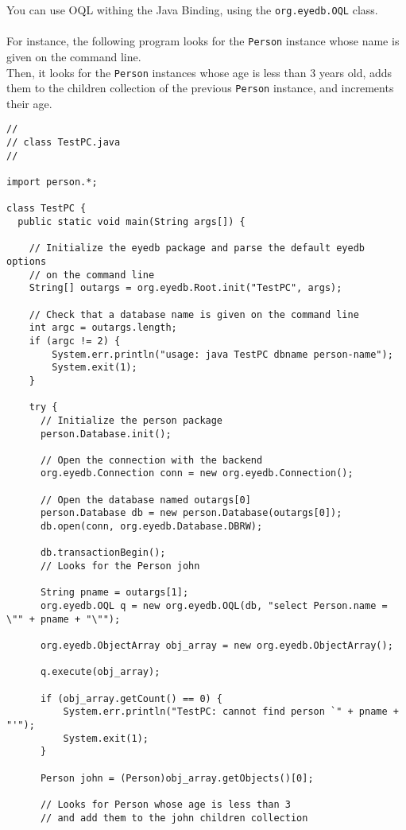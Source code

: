 You can use \eyedb OQL withing the Java Binding, using the \texttt{org.eyedb.OQL}
class.
\\
\\
For instance, the following program looks for the \texttt{Person} instance whose
name is given on the command line.
\\
Then, it looks for the \texttt{Person} instances whose age is
less than 3 years old, adds them to the children collection of the previous
\texttt{Person} instance, and increments their age.
{\verbsize \begin{verbatim}
//
// class TestPC.java
//

import person.*;

class TestPC {
  public static void main(String args[]) {

    // Initialize the eyedb package and parse the default eyedb options
    // on the command line
    String[] outargs = org.eyedb.Root.init("TestPC", args);
     
    // Check that a database name is given on the command line
    int argc = outargs.length;
    if (argc != 2) {
        System.err.println("usage: java TestPC dbname person-name");
        System.exit(1);
    }

    try {
      // Initialize the person package
      person.Database.init();

      // Open the connection with the backend
      org.eyedb.Connection conn = new org.eyedb.Connection();

      // Open the database named outargs[0]
      person.Database db = new person.Database(outargs[0]);
      db.open(conn, org.eyedb.Database.DBRW);

      db.transactionBegin();
      // Looks for the Person john

      String pname = outargs[1];
      org.eyedb.OQL q = new org.eyedb.OQL(db, "select Person.name = \"" + pname + "\"");

      org.eyedb.ObjectArray obj_array = new org.eyedb.ObjectArray();

      q.execute(obj_array);

      if (obj_array.getCount() == 0) {
          System.err.println("TestPC: cannot find person `" + pname + "'");
          System.exit(1);
      }

      Person john = (Person)obj_array.getObjects()[0];

      // Looks for Person whose age is less than 3
      // and add them to the john children collection


\end{verbatim}}
